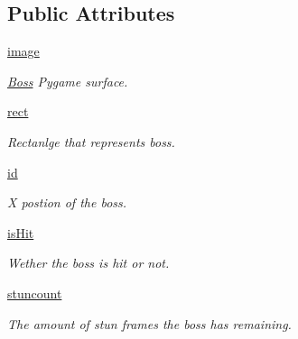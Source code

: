 \subsection*{Public Attributes}
\begin{DoxyCompactItemize}
\item 
\mbox{\label{classactor_1_1boss_1_1_boss_a33e43928fc50f5c67693e2a224e2a67c}} 
\hyperlink{classactor_1_1boss_1_1_boss_a33e43928fc50f5c67693e2a224e2a67c}{image}
\begin{DoxyCompactList}\small\item\em \hyperlink{classactor_1_1boss_1_1_boss}{Boss} Pygame surface. \end{DoxyCompactList}\item 
\mbox{\label{classactor_1_1boss_1_1_boss_a0d5392b6ba783f8c3ad68221830f26ec}} 
\hyperlink{classactor_1_1boss_1_1_boss_a0d5392b6ba783f8c3ad68221830f26ec}{rect}
\begin{DoxyCompactList}\small\item\em Rectanlge that represents boss. \end{DoxyCompactList}\item 
\hyperlink{classactor_1_1boss_1_1_boss_a88b3aa7689b1d755e49e5dfbf7f30e86}{id}
\begin{DoxyCompactList}\small\item\em X postion of the boss. \end{DoxyCompactList}\item 
\mbox{\label{classactor_1_1boss_1_1_boss_af197ba273deff12d755b58ba7d5dca8d}} 
\hyperlink{classactor_1_1boss_1_1_boss_af197ba273deff12d755b58ba7d5dca8d}{is\+Hit}
\begin{DoxyCompactList}\small\item\em Wether the boss is hit or not. \end{DoxyCompactList}\item 
\mbox{\label{classactor_1_1boss_1_1_boss_a3bfec86c38534dee464d0f415812c90f}} 
\hyperlink{classactor_1_1boss_1_1_boss_a3bfec86c38534dee464d0f415812c90f}{stuncount}
\begin{DoxyCompactList}\small\item\em The amount of stun frames the boss has remaining. \end{DoxyCompactList}\item 

\end{DoxyCompactItemize}
